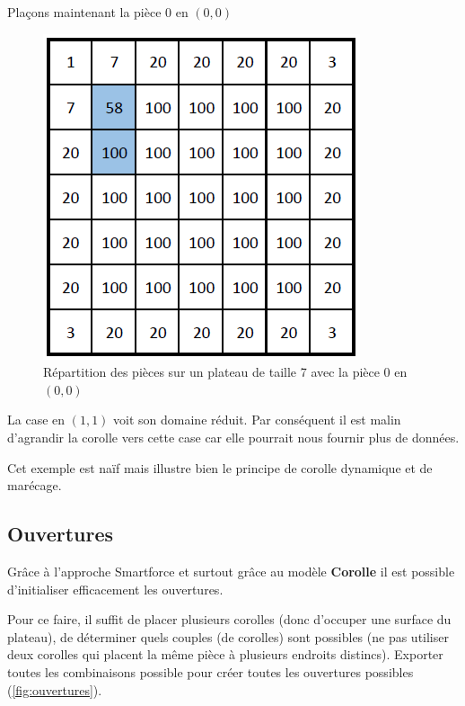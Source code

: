\begin{exmp}
		Plaçons maintenant la pièce 0 en $(0,0)$ 
		
		\begin{figure}[H]
			\centering
			\includegraphics{images/corolle_dynamique_agrandissement}
			\caption{Répartition des pièces sur un plateau de taille 7 avec la pièce 0 en $(0,0)$}
			\label{fig:corolle_dynamique_agrandissement}
		\end{figure}
		
		La case en $(1,1)$ voit son domaine réduit. Par conséquent il est malin d'agrandir la corolle vers cette case car elle pourrait nous fournir plus de données.

		\begin{note}
			Cet exemple est naïf mais illustre bien le principe de corolle dynamique et de marécage.
		\end{note}
	\end{exmp}
	\newpage
	
	\subsection{Ouvertures}
	
	Grâce à l'approche Smartforce et surtout grâce au modèle \textbf{Corolle} il est possible d'initialiser efficacement les ouvertures.
	
	Pour ce faire, il suffit de placer plusieurs corolles (donc d'occuper une surface du plateau), de déterminer quels couples (de corolles) sont possibles (ne pas utiliser deux corolles qui placent la même pièce à plusieurs endroits distincs). Exporter toutes les combinaisons possible pour créer toutes les ouvertures possibles (\autoref{fig:ouvertures}).
	

